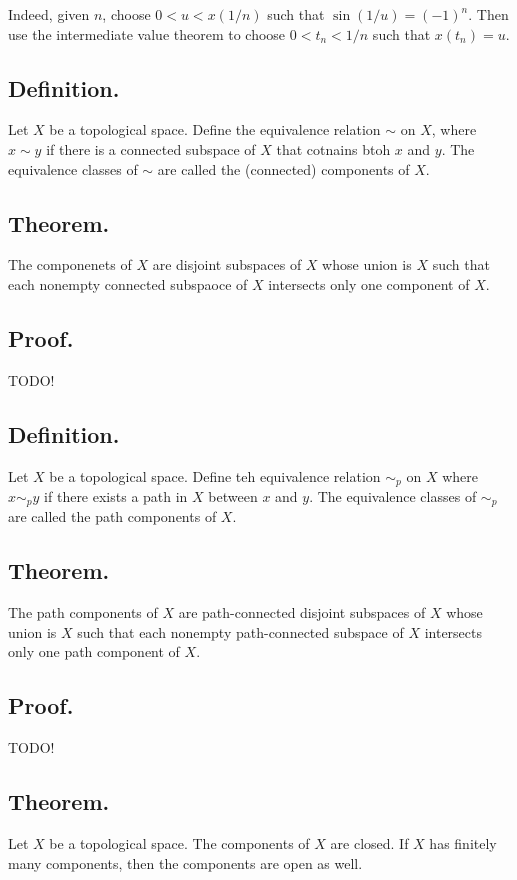 \documentclass[titlepage]{article}
\begin{document}
Indeed, given $n$, choose $0 < u < x(1/n)$ such that $\sin(1/u) = (-1)^{n}$. Then use the intermediate value theorem to choose $0 < t_{n} < 1/n$ such that $x(t_{n}) = u$.

\subsection{Definition.} Let $X$ be a topological space. Define the equivalence relation $\sim$ on $X$, where $x \sim y$ if there is a connected subspace of $X$ that cotnains btoh $x$ and $y$. The equivalence classes of $\sim$ are called the (connected) components of $X$.

\subsection{Theorem.} The componenets of $X$ are disjoint subspaces of $X$ whose union is $X$ such that each nonempty connected subspaoce of $X$ intersects only one component of $X$.

\subsection{Proof.} TODO!

\subsection{Definition.} Let $X$ be a topological space. Define teh equivalence relation $\sim_{p}$ on $X$ where $x \sim_{p} y$ if there exists a path in $X$ between $x$ and $y$. The equivalence classes of $\sim_{p}$ are called the path components of $X$.

\subsection{Theorem.} The path components of $X$ are path-connected disjoint subspaces of $X$ whose union is $X$ such that each nonempty path-connected subspace of $X$ intersects only one path component of $X$.

\subsection{Proof.} TODO!

\subsection{Theorem.} Let $X$ be a topological space. The components of $X$ are closed. If $X$ has finitely many components, then the components are open as well.
\end{document}
